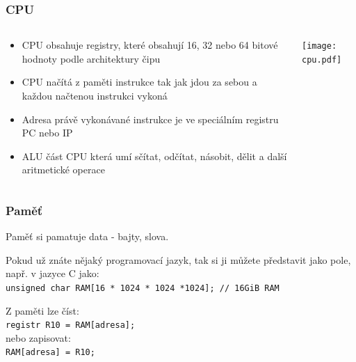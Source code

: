 \documentclass{beamer}
\begin{document}
\begin{frame}
\frametitle{CPU}
\begin{columns}
\begin{column}{0.5\textwidth}
\begin{itemize}
\item CPU obsahuje registry, které obsahují 16, 32 nebo 64 bitové hodnoty podle architektury čipu
\item CPU načítá z paměti instrukce tak jak jdou za sebou a každou načtenou instrukci vykoná
\item Adresa právě vykonávané instrukce je ve speciálním registru PC nebo IP
\item ALU část CPU která umí sčítat, odčítat, násobit, dělit a další aritmetické operace
\end{itemize}
\end{column}
\begin{column}{0.5\textwidth}  
\begin{center}
   \texttt{[image: cpu.pdf]}
\end{center}
\end{column}
\end{columns}

\end{frame}



\begin{frame}
\frametitle{Paměť}

Paměť si pamatuje data - bajty, slova.

Pokud už znáte nějaký programovací jazyk, tak si ji můžete představit jako pole, např. v jazyce C jako:\\
\texttt{unsigned char RAM[16 * 1024 * 1024 *1024]; // 16GiB RAM}

\bigskip
Z paměti lze číst:\\
\texttt{registr R10 = RAM[adresa];}\\
nebo zapisovat:\\
\texttt{RAM[adresa] = R10;}

\end{frame}
\end{document}
